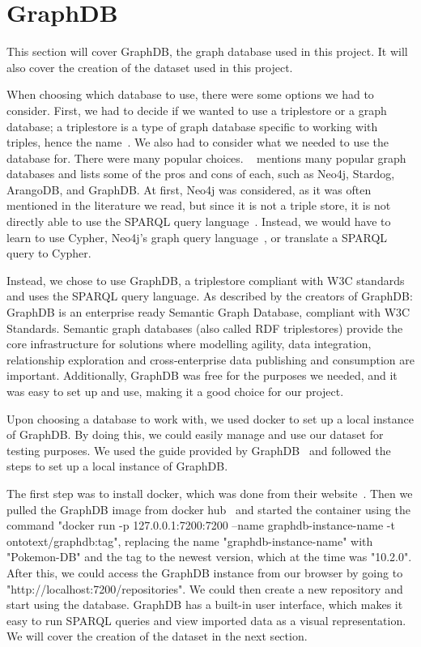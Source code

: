 \section{GraphDB}\label{sec:graphdb}
This section will cover GraphDB, the graph database used in this project. It will also cover the creation of the dataset used in this project.

When choosing which database to use, there were some options we had to consider. First, we had to decide if we wanted to use a triplestore or a graph database; a triplestore is a type of graph database specific to working with triples, hence the name~\cite{ontotext-RDF-triplestore}. We also had to consider what we needed to use the database for. There were many popular choices. ~ \cite{best-graph-databases} mentions many popular graph databases and lists some of the pros and cons of each, such as Neo4j, Stardog, ArangoDB, and GraphDB. At first, Neo4j was considered, as it was often mentioned in the literature we read, but since it is not a triple store, it is not directly able to use the SPARQL query language~\cite{neo4j:-a-reasonable-RDF-graph-database}. Instead, we would have to learn to use Cypher, Neo4j's graph query language~\cite{cypher-query-language}, or translate a SPARQL query to Cypher.

Instead, we chose to use GraphDB, a triplestore compliant with W3C standards and uses the SPARQL query language. As described by the creators of GraphDB: \cite{graphDB}{GraphDB is an enterprise ready Semantic Graph Database, compliant with W3C Standards. Semantic graph databases (also called RDF triplestores) provide the core infrastructure for solutions where modelling agility, data integration, relationship exploration and cross-enterprise data publishing and consumption are important.}
Additionally, GraphDB was free for the purposes we needed, and it was easy to set up and use, making it a good choice for our project.

Upon choosing a database to work with, we used docker to set up a local instance of GraphDB. By doing this, we could easily manage and use our dataset for testing purposes. We used the guide provided by GraphDB~\cite{docker-graphDB} and followed the steps to set up a local instance of GraphDB.

The first step was to install docker, which was done from their website~\cite{docker-install}. Then we pulled the GraphDB image from docker hub~\cite{docker-graphDB} and started the container using the command "docker run -p 127.0.0.1:7200:7200 --name graphdb-instance-name -t ontotext/graphdb:tag", replacing the name "graphdb-instance-name" with "Pokemon-DB" and the tag to the newest version, which at the time was "10.2.0". After this, we could access the GraphDB instance from our browser by going to "http://localhost:7200/repositories". We could then create a new repository and start using the database. GraphDB has a built-in user interface, which makes it easy to run SPARQL queries and view imported data as a visual representation. We will cover the creation of the dataset in the next section.

